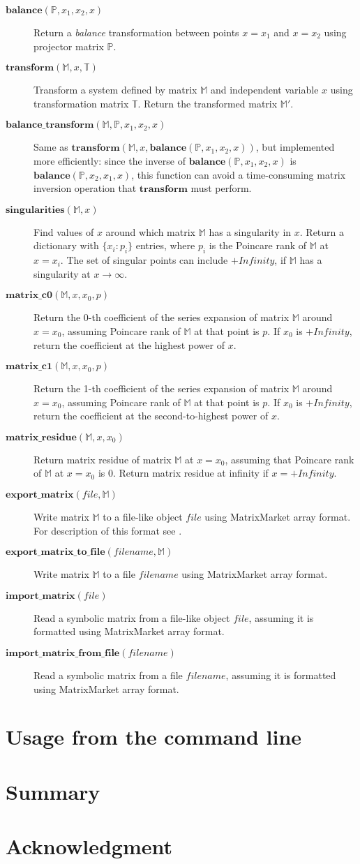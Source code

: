 \documentclass[12pt,twoside,a4paper]{article}
\def\F#1{\mathbf{#1}} %
\def\M#1{\mathbb{#1}} %
\def\functionitem#1#2{\item[$\F{#1}(#2)$]}
\begin{document}
\begin{description}
\functionitem{balance}{\M P, x_1, x_2, x}
Return a \textit{balance} transformation between points $x=x_1$
and $x=x_2$ using projector matrix $\M P$.

\functionitem{transform}{\M M, x, \M T}
Transform a system defined by matrix $\M M$ and independent
variable $x$ using transformation matrix $\M T$. Return the
transformed matrix $\M M'$.

\functionitem{balance\_transform}{\M M, \M P, x_1, x_2, x}
Same as $\F{transform}(\M M, x, \F{balance}(\M P, x_1, x_2, x))$,
but implemented more efficiently: since the inverse of
$\F{balance}(\M P, x_1, x_2, x)$ is $\F{balance}(\M P, x_2, x_1, x)$,
this function can avoid a time-consuming matrix inversion
operation that $\F{transform}$ must perform.

\functionitem{singularities}{\M M, x}
Find values of $x$ around which matrix $\M M$ has a singularity in
$x$. Return a dictionary with $\{x_i: p_i\}$ entries, where $p_i$
is the Poincare rank of $\M M$ at $x=x_i$. The set of singular points
can include $+Infinity$, if $\M M$ has a singularity at $x\to\infty$.

\functionitem{matrix\_c0}{\M M, x, x_0, p}
Return the 0-th coefficient of the series expansion of matrix
$\M M$ around $x=x_0$, assuming Poincare rank of $\M M$ at that
point is $p$. If $x_0$ is $+Infinity$, return the coefficient
at the highest power of $x$.

\functionitem{matrix\_c1}{\M M, x, x_0, p}
Return the 1-th coefficient of the series expansion of matrix
$\M M$ around $x=x_0$, assuming Poincare rank of $\M M$ at that
point is $p$. If $x_0$ is $+Infinity$, return the coefficient
at the second-to-highest power of $x$.

\functionitem{matrix\_residue}{\M M, x, x_0}
Return matrix residue of matrix $\M M$ at $x=x_0$, assuming that
Poincare rank of $\M M$ at $x=x_0$ is $0$. Return matrix residue
at infinity if $x=+Infinity$.

\functionitem{export\_matrix}{file, \M M}
Write matrix $\M M$ to a file-like object $file$ using MatrixMarket
array format. For description of this format see \cite{MMarket}.

\functionitem{export\_matrix\_to\_file}{filename, \M M}
Write matrix $\M M$ to a file $filename$ using MatrixMarket
array format.

\functionitem{import\_matrix}{file}
Read a symbolic matrix from a file-like object $file$, assuming
it is formatted using MatrixMarket array format.

\functionitem{import\_matrix\_from\_file}{filename}
Read a symbolic matrix from a file $filename$, assuming it is
formatted using MatrixMarket array format.

\end{description}

\section{Usage from the command line}

\section{Summary}

\section*{Acknowledgment}


\end{document}
